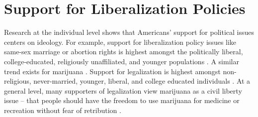 










\section{Support for Liberalization Policies}


Research at the individual level shows that Americans' support for political issues centers on ideology. For example, support for liberalization policy issues like same-sex marriage or abortion rights is highest amongst the politically liberal, college-educated, religiously unaffiliated, and younger populations \citep{baunach_2012,zucker_1999,pew_2017_ssm,pew_2017_ab}. A similar trend exists for  marijuana \citep{caulkins_et_al_2012,newhart_and_dolphin_2018,schnabel_and_sevell_2017,rosenthal_and_kubby_1996}. Support for legalization is highest amongst non-religious, never-married, younger, liberal, and college educated individuals \citep{schnabel_and_sevell_2017,pew_2015,elder_and_greene_2019,eagly_et_al_2004}. At a general level, many supporters of legalization view marijuana as a civil liberty issue -- that people should have the freedom to use marijuana for medicine or recreation without fear of retribution \citep{newhart_and_dolphin_2018,schnabel_and_sevell_2017,rosenthal_and_kubby_1996}. 




